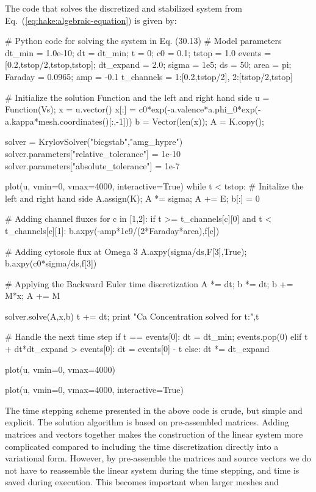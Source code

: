 The \pydolfin code that solves the discretized and stabilized system from Eq.~(\ref{eq:hake:algebraic-equation}) is given by:
\begin{python}
# Python code for solving the system in Eq. (30.13)
# Model parameters
dt_min = 1.0e-10; dt = dt_min; t = 0; c0 = 0.1; tstop = 1.0
events = [0.2,tstop/2,tstop,tstop]; dt_expand = 2.0;
sigma = 1e5; ds = 50; area = pi; Faraday = 0.0965; amp = -0.1
t_channels = {1:[0.2,tstop/2], 2:[tstop/2,tstop]}

# Initialize the solution Function and the left and right hand side
u = Function(Vs); x = u.vector()
x[:] = c0*exp(-a.valence*a.phi_0*exp(-a.kappa*mesh.coordinates()[:,-1]))
b = Vector(len(x)); A = K.copy();

solver = KrylovSolver("bicgstab","amg_hypre")
solver.parameters["relative_tolerance"] = 1e-10
solver.parameters["absolute_tolerance"] = 1e-7

plot(u, vmin=0, vmax=4000, interactive=True)
while t < tstop:
    # Initalize the left and right hand side
    A.assign(K); A *= sigma; A += E; b[:] = 0

    # Adding channel fluxes
    for c in [1,2]:
        if t >= t_channels[c][0] and t < t_channels[c][1]:
            b.axpy(-amp*1e9/(2*Faraday*area),f[c])

    # Adding cytosole flux at Omega 3
    A.axpy(sigma/ds,F[3],True); b.axpy(c0*sigma/ds,f[3])

    # Applying the Backward Euler time discretization
    A *= dt; b *= dt; b += M*x; A += M

    solver.solve(A,x,b)
    t += dt; print "Ca Concentration solved for t:",t

    # Handle the next time step
    if t == events[0]:
        dt = dt_min; events.pop(0)
    elif t + dt*dt_expand > events[0]:
        dt = events[0] - t
    else:
        dt *= dt_expand

    plot(u, vmin=0, vmax=4000)

plot(u, vmin=0, vmax=4000, interactive=True)
\end{python}
The time stepping scheme presented in the above code is crude, but
simple and explicit. The solution algorithm is based on pre-assembled
matrices. Adding matrices and vectors together makes the construction
of the linear system more complicated compared to including the time
discretization directly into a variational form. However, by
pre-assemble the matrices and source vectors we do not have to
reassemble the linear system during the time stepping, and time is
saved during execution. This becomes important when larger meshes and
